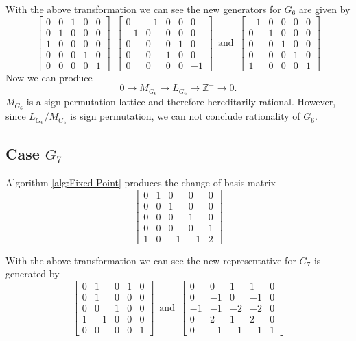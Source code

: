 \documentclass{article}
\theoremstyle{plain}
\theoremstyle{definition}
\newcommand{\Z}{\ensuremath{\mathbb{Z}}}
\newcommand{\tand}{\ensuremath{\,\,\, \text{and} \,\,\,}}
\newcommand{\exactseqs}[1]{\ensuremath{0 \longrightarrow M_{#1} \longrightarrow L_{#1} \longrightarrow \Z^{-} \longrightarrow 0}}
\begin{document}
With the above transformation we can see the new generators for $G_6$ are given by 
$$
 \left[ \begin {array}{cccc|c} 0&0&1&0&0\\ 0&1&0&0&0
\\ 1&0&0&0&0\\ 0&0&0&1&0
\\ \hline 0&0&0&0&1\end {array} \right] 
\,\,\,
 \left[ \begin {array}{cccc|c} 0&-1&0&0&0\\ -1&0&0&0&0
\\ 0&0&0&1&0\\ 0&0&1&0&0
\\ \hline 0&0&0&0&-1\end {array} \right] 
\tand
 \left[ \begin {array}{cccc|c} -1&0&0&0&0\\ 0&1&0&0&0
\\ 0&0&1&0&0\\ 0&0&0&1&0
\\ \hline 1&0&0&0&1\end {array} \right] 
$$
Now we can produce
$$
\exactseqs{G_6}
.$$
$M_{G_6}$ is a sign permutation lattice and therefore hereditarily rational. However, since $L_{G_6}/M_{G_6}$ is sign permutation, we can not conclude rationality of $G_6$.


\subsection{Case $G_7$}

Algorithm \ref{alg:Fixed Point} produces the change of basis matrix 
$$
\left[ \begin {array}{ccccc} 0&1&0&0&0\\ 0&0&1&0&0
\\ 0&0&0&1&0\\ 0&0&0&0&1
\\ 1&0&-1&-1&2\end {array} \right] 
$$

With the above transformation we can see the new representative for $G_7$ is generated by 
$$
\left[ \begin {array}{cccc|c} 0&1&0&1&0\\  0&1&0&0&0
\\  0&0&1&0&0\\  1&-1&0&0&0
\\  \hline 0&0&0&0&1\end {array} \right] 
\tand
 \left[ \begin {array}{cccc|c} 0&0&1&1&0\\  0&-1&0&-1&0
\\  -1&-1&-2&-2&0\\  0&2&1&2&0
\\ \hline 0&-1&-1&-1&1\end {array} \right] 
$$
\end{document}
